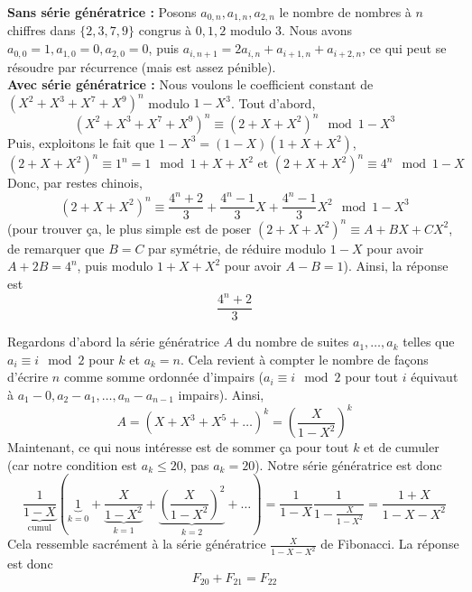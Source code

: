 \begin{sol}
\textbf{Sans série génératrice :} Posons $a_{0, n}, a_{1, n}, a_{2, n}$ le nombre de nombres à $n$ chiffres dans $\{2, 3, 7, 9\}$ congrus à $0, 1, 2$ modulo $3$. Nous avons $a_{0, 0} = 1, a_{1, 0} = 0, a_{2, 0} = 0$, puis $a_{i, n + 1} = 2a_{i, n} + a_{i + 1, n} + a_{i + 2, n}$, ce qui peut se résoudre par récurrence (mais est assez pénible). \\
\textbf{Avec série génératrice :} Nous voulons le coefficient constant de $(X^2 + X^3 + X^7 + X^9)^n$ modulo $1 - X^3$. Tout d'abord,
$$(X^2 + X^3 + X^7 + X^9)^n \equiv (2 + X + X^2)^n \mod 1 - X^3$$
Puis, exploitons le fait que $1 - X^3 = (1 - X)(1 + X + X^2)$,
$$(2 + X + X^2)^n \equiv 1^n = 1 \mod 1 + X + X^2 \text{ et } (2 + X + X^2)^n \equiv 4^n \mod 1 - X$$
Donc, par restes chinois,
$$(2 + X + X^2)^n \equiv \frac{4^n + 2}3 + \frac{4^n - 1}3 X + \frac{4^n - 1}3 X^2 \mod 1 - X^3$$
(pour trouver ça, le plus simple est de poser $(2 + X + X^2)^n \equiv A + BX + CX^2$, de remarquer que $B = C$ par symétrie, de réduire modulo $1 - X$ pour avoir $A + 2B = 4^n$, puis modulo $1 + X + X^2$ pour avoir $A - B = 1$). Ainsi, la réponse est
$$\frac{4^n + 2}3$$
\end{sol}


\begin{sol}
Regardons d'abord la série génératrice $A$ du nombre de suites $a_1, \dots, a_k$ telles que $a_i \equiv i \mod 2$ pour $k$ et $a_k = n$. Cela revient à compter le nombre de façons d'écrire $n$ comme somme ordonnée d'impairs ($a_i \equiv i \mod 2$ pour tout $i$ équivaut à $a_1 - 0, a_2 - a_1, \dots, a_n - a_{n - 1}$ impairs). Ainsi,
$$A = (X + X^3 + X^5 + \dots)^k = \left(\frac X{1 - X^2} \right)^k$$
Maintenant, ce qui nous intéresse est de sommer ça pour tout $k$ et de cumuler (car notre condition est $a_k \le 20$, pas $a_k = 20$). Notre série génératrice est donc
$$\underbrace{\frac 1{1 - X}}_{\text{cumul}}\left(\underbrace{1}_{k = 0} + \underbrace{\frac X{1 - X^2}}_{k = 1} + \underbrace{\left(\frac X{1 - X^2} \right)^2}_{k = 2} + \dots\right) = \frac 1{1 - X}\frac 1{1 - \frac X{1 - X^2}} = \frac{1 + X}{1 - X - X^2}$$
Cela ressemble sacrément à la série génératrice $\frac{X}{1 - X - X^2}$ de Fibonacci. La réponse est donc
$$F_{20} + F_{21} = F_{22}$$
\end{sol}


\begin{sol}
\end{sol}


